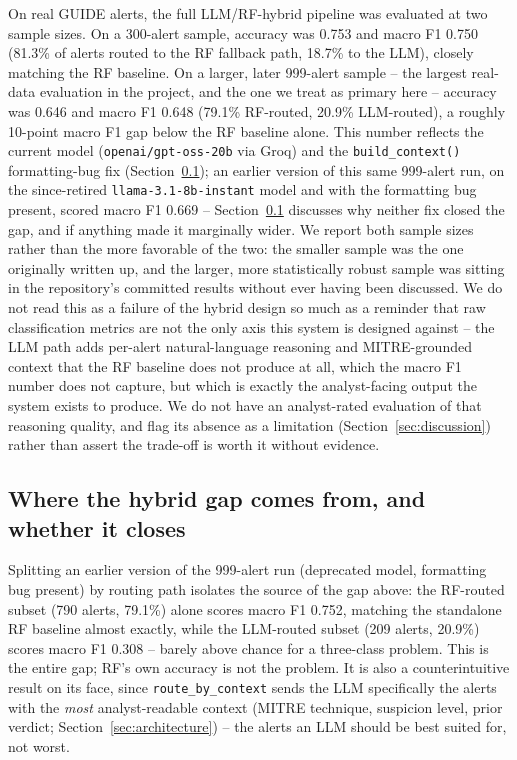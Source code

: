 \documentclass[conference]{IEEEtran}
\begin{document}
On real GUIDE alerts, the full LLM/RF-hybrid pipeline was evaluated at two sample sizes. On a
300-alert sample, accuracy was 0.753 and macro F1 0.750 (81.3\% of alerts routed to the RF
fallback path, 18.7\% to the LLM), closely matching the RF baseline. On a larger, later 999-alert
sample -- the largest real-data evaluation in the project, and the one we treat as primary here --
accuracy was 0.646 and macro F1 0.648 (79.1\% RF-routed, 20.9\% LLM-routed), a roughly 10-point
macro F1 gap below the RF baseline alone. This number reflects the current model
(\texttt{openai/gpt-oss-20b} via Groq) and the
\texttt{build\_context()} formatting-bug fix (Section~\ref{sec:llmgap}); an earlier version of this
same 999-alert run, on the since-retired \texttt{llama-3.1-8b-instant} model and with the
formatting bug present, scored macro F1 0.669 -- Section~\ref{sec:llmgap} discusses why neither
fix closed the gap, and if anything made it marginally wider. We report both sample sizes rather
than the more favorable of the two: the smaller sample was the one originally written up, and the
larger, more statistically robust sample was sitting in the repository's committed results without
ever having been discussed. We do not read this as a failure of the hybrid design so much as a
reminder that raw
classification metrics are not the only axis this system is designed against -- the LLM path adds
per-alert natural-language reasoning and MITRE-grounded context that the RF baseline does not
produce at all, which the macro F1 number does not capture, but which is exactly the
analyst-facing output the system exists to produce. We do not have an analyst-rated evaluation of
that reasoning quality, and flag its absence as a limitation (Section~\ref{sec:discussion}) rather
than assert the trade-off is worth it without evidence.

\subsection{Where the hybrid gap comes from, and whether it closes}
\label{sec:llmgap}

Splitting an earlier version of the 999-alert run (deprecated model, formatting bug present) by
routing path isolates the source of the gap above: the RF-routed subset (790 alerts, 79.1\%) alone
scores macro F1 0.752, matching the standalone RF baseline almost exactly, while the LLM-routed
subset (209 alerts, 20.9\%) scores macro F1 0.308 -- barely above chance for a three-class problem.
This is the entire gap; RF's own accuracy is not the problem. It
is also a counterintuitive result on its face, since \texttt{route\_by\_context} sends the LLM
specifically the alerts with the \emph{most} analyst-readable context (MITRE technique, suspicion
level, prior verdict; Section~\ref{sec:architecture}) -- the alerts an LLM should be best suited
for, not worst.
\end{document}
